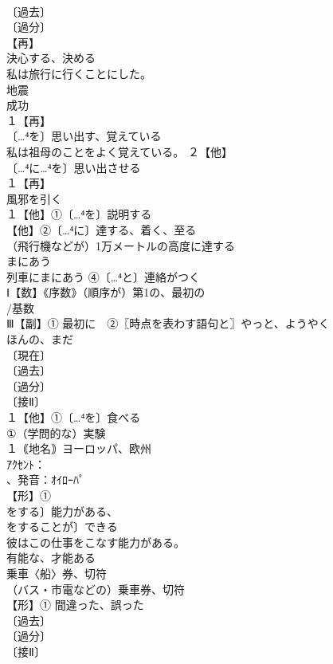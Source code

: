 \documentclass[8pt]{extreport}
\begin{document}
\begin{CJK}{UTF8}{min}
\\	〔過去〕
\\	〔過分〕
\\	【再】
\\	決心する、決める
\\	私は旅行に行くことにした。 
\\	地震 
\\	成功
\\	１【再】
\\	〔…⁴を〕思い出す、覚えている
\\	私は祖母のことをよく覚えている。 ２【他】
\\	〔…⁴に…⁴を〕思い出させる
\\	１【再】
\\	風邪を引く
\\	１【他】①〔…⁴を〕説明する
\\	【他】②〔…⁴に〕達する、着く、至る 
\\	（飛行機などが）1万メートルの高度に達する 
\\	まにあう 
\\	列車にまにあう ④〔…⁴と〕連絡がつく
\\	Ⅰ【数】《序数》（順序が）第1の、最初の
\\	/基数
\\	Ⅲ【副】① 最初に　②〖時点を表わす語句と〗やっと、ようやく
\\	ほんの、まだ
\\	〔現在〕
\\	〔過去〕
\\	〔過分〕
\\	〔接Ⅱ〕
\\	１【他】①〔…⁴を〕食べる
\\	①（学問的な）実験 
\\	１｟地名｠ヨーロッパ、欧州
\\	ｱｸｾﾝﾄ：
\\	、発音：ｵｲﾛｰﾊﾟ
\\	【形】①
\\	をする〕能力がある、
\\	をすることが〕できる
\\	彼はこの仕事をこなす能力がある。 
\\	有能な、才能ある
\\	乗車〈船〉券、切符
\\	（バス・市電などの）乗車券、切符
\\	【形】① 間違った、誤った
\\	〔過去〕
\\	〔過分〕
\\	〔接Ⅱ〕

\end{CJK}
\end{document}
